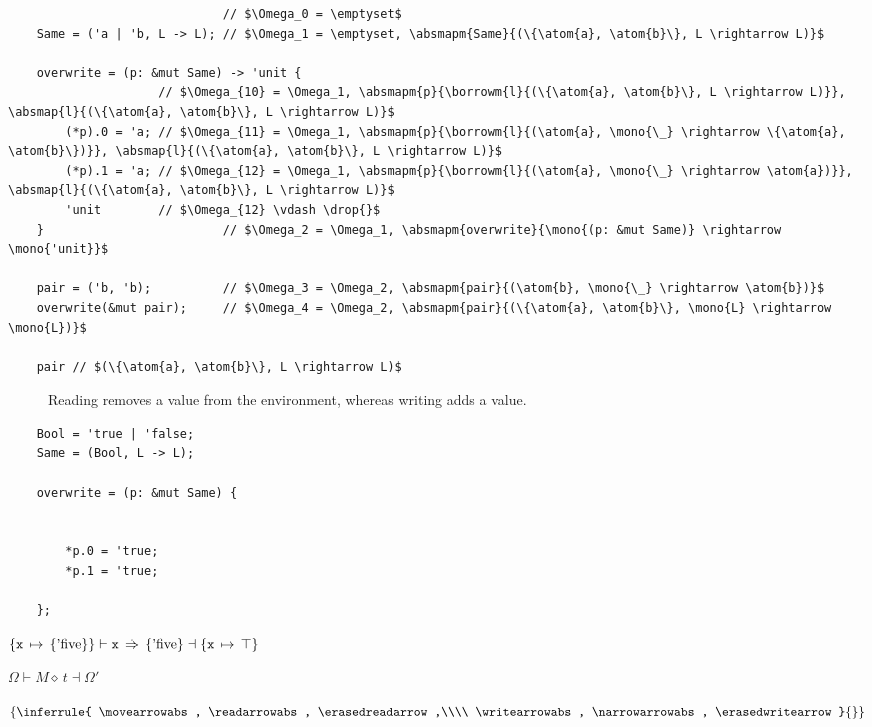 \documentclass[12pt,twoside]{report}
\begin{document}
\begin{listing}[H]
    \begin{verbatim}
                              // $\Omega_0 = \emptyset$
    Same = ('a | 'b, L -> L); // $\Omega_1 = \emptyset, \absmapm{Same}{(\{\atom{a}, \atom{b}\}, L \rightarrow L)}$

    overwrite = (p: &mut Same) -> 'unit {
                     // $\Omega_{10} = \Omega_1, \absmapm{p}{\borrowm{l}{(\{\atom{a}, \atom{b}\}, L \rightarrow L)}}, \absmap{l}{(\{\atom{a}, \atom{b}\}, L \rightarrow L)}$
        (*p).0 = 'a; // $\Omega_{11} = \Omega_1, \absmapm{p}{\borrowm{l}{(\atom{a}, \mono{\_} \rightarrow \{\atom{a}, \atom{b}\})}}, \absmap{l}{(\{\atom{a}, \atom{b}\}, L \rightarrow L)}$
        (*p).1 = 'a; // $\Omega_{12} = \Omega_1, \absmapm{p}{\borrowm{l}{(\atom{a}, \mono{\_} \rightarrow \atom{a})}}, \absmap{l}{(\{\atom{a}, \atom{b}\}, L \rightarrow L)}$
        'unit        // $\Omega_{12} \vdash \drop{}$
    }                         // $\Omega_2 = \Omega_1, \absmapm{overwrite}{\mono{(p: &mut Same)} \rightarrow \mono{'unit}}$

    pair = ('b, 'b);          // $\Omega_3 = \Omega_2, \absmapm{pair}{(\atom{b}, \mono{\_} \rightarrow \atom{b})}$
    overwrite(&mut pair);     // $\Omega_4 = \Omega_2, \absmapm{pair}{(\{\atom{a}, \atom{b}\}, \mono{L} \rightarrow \mono{L})}$

    pair // $(\{\atom{a}, \atom{b}\}, L \rightarrow L)$
    \end{verbatim}
\end{listing}

\begin{figure}
    \begin{mathpar}
  
    \end{mathpar}
    \caption{Reading removes a value from the environment, whereas writing adds a value.}
    \label{fig:readvswrite}
\end{figure}

\begin{verbatim}
    Bool = 'true | 'false;
    Same = (Bool, L -> L);

    overwrite = (p: &mut Same) {


        *p.0 = 'true;
        *p.1 = 'true;

    };
\end{verbatim}

$\{ \absmapm{x}{\{\atom{five}\}} \} \vdash \mono{x} \movearrowabs \{\atom{five}\} \dashv \{ \absmapm{x}{\top} \}$

$\Omega \vdash M \diamond \, t \dashv \Omega'$

$\left\{
\inferrule{
    \movearrowabs, \readarrowabs, \erasedreadarrow,\\\\
    \writearrowabs, \narrowarrowabs, \erasedwritearrow
}{}
\right\}$
\end{document}
